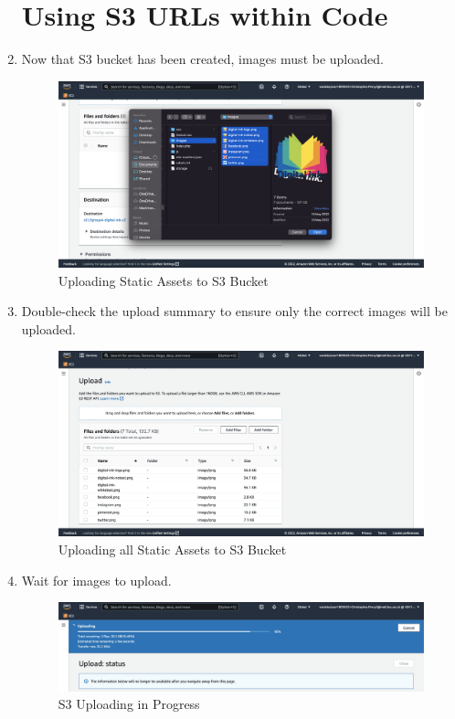 \begin{enumerate}
    \section{Using S3 URLs within Code}


    \item Now that S3 bucket has been created, images must be uploaded.
        \begin{figure}[H]
            \centering
            \includegraphics[width=\textwidth]{resources/s3/s3-image-upload.png}
            \caption{Uploading Static Assets to S3 Bucket}
            \label{fig:s3-image-upload}
        \end{figure}


    \item Double-check the upload summary to ensure only the correct images will be uploaded.
        \begin{figure}[H]
            \centering
            \includegraphics[width=\textwidth]{resources/s3/s3-upload-summary.png}
            \caption{Uploading all Static Assets to S3 Bucket}
            \label{fig:s3-upload-summary}
        \end{figure}

    \item Wait for images to upload.
        \begin{figure}[H]
            \centering
            \includegraphics[width=\textwidth]{resources/s3/s3-uploading.png}
            \caption{S3 Uploading in Progress}
            \label{fig:s3-uploading}
        \end{figure}


\end{enumerate}
